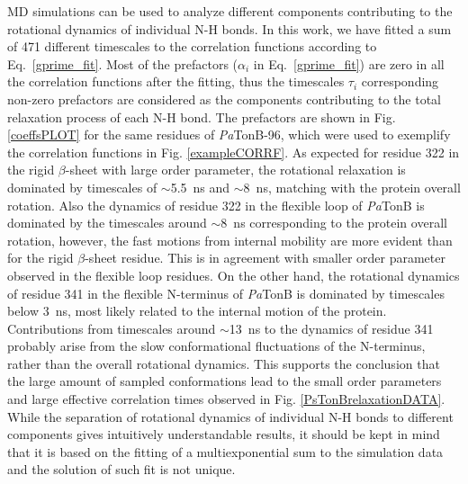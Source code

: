 \documentclass[journal=jpcbfk,manuscript=article]{achemso}
\begin{document}
MD simulations can be used to analyze different components contributing to
the rotational dynamics of individual N-H bonds.
In this work, we have fitted a sum of 471 different
timescales to the correlation functions according to Eq.~\ref{gprime_fit}.
Most of the prefactors ($\alpha_i$ in Eq.~\ref{gprime_fit}) are zero
in all the correlation functions after the fitting,
thus the timescales $\tau_i$ corresponding non-zero prefactors
are considered as the components contributing to the total relaxation process of each N-H bond.
The prefactors are shown in Fig. \ref{coeffsPLOT} for the same residues
of {\it Pa}TonB-96, which were used to exemplify the correlation functions in Fig. \ref{exampleCORRF}.
As expected for residue 322 in the rigid $\beta$-sheet with large order parameter,
the rotational relaxation is dominated by timescales of $\sim$5.5~ns and $\sim$8~ns,
matching with the protein overall
rotation. Also the dynamics of residue 322 in the flexible loop of {\it Pa}TonB is
dominated by the timescales around $\sim$8~ns corresponding to the protein overall rotation,
however, the fast motions from internal mobility are more evident than for the
rigid $\beta$-sheet residue. This is in agreement with smaller order parameter observed
in the flexible loop residues. On the other hand, the rotational dynamics of
residue 341 in the flexible N-terminus of {\it Pa}TonB is dominated by timescales
below 3~ns, most likely related to the internal motion of the protein.
Contributions from timescales around $\sim$13~ns to the dynamics of residue 341 probably
arise from the slow conformational fluctuations of the N-terminus, rather than the overall
rotational dynamics. This supports the conclusion that the large amount of sampled
conformations lead to the small order parameters and large effective correlation times
observed in Fig. \ref{PsTonBrelaxationDATA}.
While the separation of rotational dynamics of individual N-H bonds to different components
gives intuitively understandable results, it should be kept in mind that
it is based on the fitting of a multiexponential sum to the simulation data and the solution
of such fit is not unique.
\end{document}
